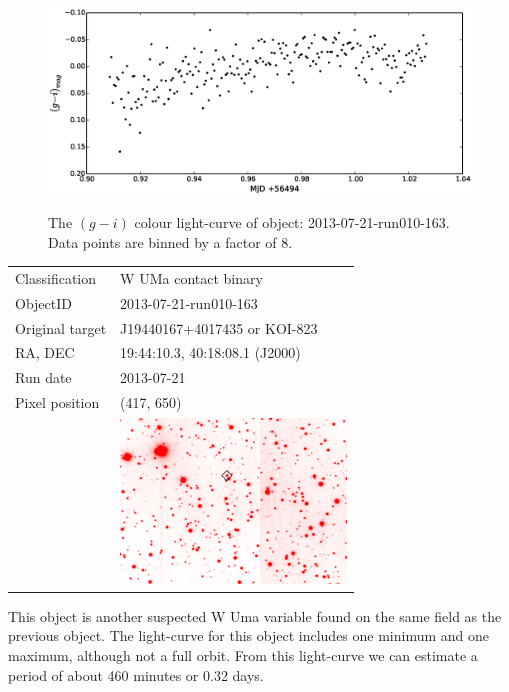 \begin{figure}
  \center
  \includegraphics[width=120mm]{images/2013-07-21-run010-163_colourcurve-bin8.eps}
  \label{fig:2013-07-21-run010-163}
  \caption{The $(g - i)$ colour light-curve of object: 2013-07-21-run010-163. Data points are binned by a factor of 8.}
\end{figure}


\begin{tabular}{l l}
  Classification & {W UMa} contact binary \\
  ObjectID & 2013-07-21-run010-163 \\
  Original target & J19440167+4017435 or KOI-823 \\
  RA, DEC & 19:44:10.3, 40:18:08.1 (J2000) \\
  Run date & 2013-07-21 \\
  Pixel position & (417, 650) \\
       & \includegraphics[width=60mm]{images/2013-07-21-run010-163.png} \\
  \end{tabular}

This object is another suspected {W Uma} variable found on the same field as the previous object. The light-curve for this object includes one minimum and one maximum, although not a full orbit. From this light-curve we can estimate a period of about 460 minutes or 0.32 days.


\newpage
  
